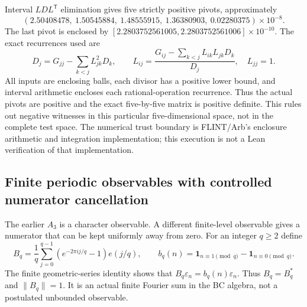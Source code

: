 Interval $LDL^{\mathsf T}$ elimination gives five strictly positive pivots,
approximately
\[
 (2.50408478,\ 1.50545884,\ 1.48555915,\ 1.36380903,\ 0.02280375)
 \times10^{-8}.
\]
The last pivot is enclosed by
$[2.2803752561005,2.2803752561006]\times10^{-10}$.
The exact recurrences used are
\[
 D_j=G_{jj}-\sum_{k<j}L_{jk}^2D_k,\qquad
 L_{ij}=\frac{G_{ij}-\sum_{k<j}L_{ik}L_{jk}D_k}{D_j},\quad L_{jj}=1.
\]
All inputs are enclosing balls, each divisor has a positive lower bound,
and interval arithmetic encloses each rational-operation recurrence.
Thus the actual pivots are positive and the exact five-by-five matrix is
positive definite. This rules out negative witnesses in this particular
five-dimensional space, not in the complete test space. The numerical trust
boundary is FLINT/Arb's enclosure arithmetic and integration implementation;
this execution is not a Lean verification of that implementation.

\subsection{Finite periodic observables with controlled numerator cancellation}

The earlier $A_3$ is a character observable. A different finite-level
observable gives a numerator that can be kept uniformly away from zero.
For an integer $q\ge2$ define
\begin{equation}
 B_q=\frac1q\sum_{j=0}^{q-1}(e^{-2\pi i j/q}-1)e(j/q),\qquad
 b_q(n)=\mathbf1_{n\equiv1\pmod q}-\mathbf1_{n\equiv0\pmod q}.
 \label{eq:rh-periodic-observable}
\end{equation}
The finite geometric-series identity shows that $B_q\varepsilon_n
=b_q(n)\varepsilon_n$. Thus $B_q=B_q^*$ and $\|B_q\|=1$.
It is an actual finite Fourier sum in the BC algebra, not a
postulated unbounded observable.

